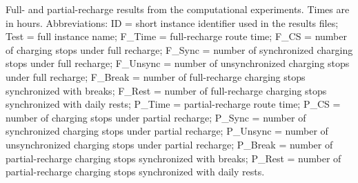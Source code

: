 \documentclass[3p,11pt,authoryear]{elsarticle}  %
\begin{document}
\begin{table}[htbp]
\TABLE
{Full- and partial-recharge results from the computational experiments. Times are in hours. Abbreviations: ID = short instance identifier used in the results files; Test = full instance name; F\_Time = full-recharge route time; F\_CS = number of charging stops under full recharge; F\_Sync = number of synchronized charging stops under full recharge; F\_Unsync = number of unsynchronized charging stops under full recharge; F\_Break = number of full-recharge charging stops synchronized with breaks; F\_Rest = number of full-recharge charging stops synchronized with daily rests; P\_Time = partial-recharge route time; P\_CS = number of charging stops under partial recharge; P\_Sync = number of synchronized charging stops under partial recharge; P\_Unsync = number of unsynchronized charging stops under partial recharge; P\_Break = number of partial-recharge charging stops synchronized with breaks; P\_Rest = number of partial-recharge charging stops synchronized with daily rests.\label{tab:appendix_full_results}}
{\small\setlength{\tabcolsep}{3pt}\renewcommand{\arraystretch}{1.15}
\centering
{}}
\end{table}
\end{document}
